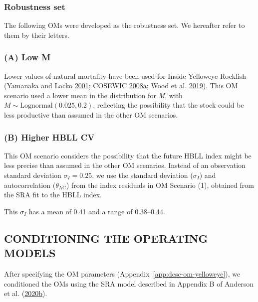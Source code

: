\documentclass[11pt]{book}
\begin{document}
\hypertarget{sec:approach3-robustness}{%
\subsubsection{Robustness set}\label{sec:approach3-robustness}}

The following OMs were developed as the robustness set. We hereafter refer to them by their letters.

\hypertarget{sec:approach3-referenceA}{%
\subsubsection{(A) Low M}\label{sec:approach3-referenceA}}

Lower values of natural mortality have been used for Inside Yelloweye Rockfish (Yamanaka and Lacko \protect\hyperlink{ref-yamanaka2001}{2001}; COSEWIC \protect\hyperlink{ref-cosewic2008}{2008}\protect\hyperlink{ref-cosewic2008}{a}; Wood et al. \protect\hyperlink{ref-wood2019}{2019}). This OM scenario used a lower mean in the distribution for \emph{M}, with \(M \sim \textrm{Lognormal}(0.025, 0.2)\), reflecting the possibility that the stock could be less productive than assumed in the other OM scenarios.

\hypertarget{sec:approach3-referenceB}{%
\subsubsection{(B) Higher HBLL CV}\label{sec:approach3-referenceB}}

This OM scenario considers the possibility that the future HBLL index might be less precise than assumed in the other OM scenarios. Instead of an observation standard deviation \(\sigma_I = 0.25\), we use the standard deviation (\(\sigma_I\)) and autocorrelation (\(\theta_\textrm{AC}\)) from the index residuals in OM Scenario (1), obtained from the SRA fit to the HBLL index.

This \(\sigma_I\) has a mean of 0.41 and a range of 0.38--0.44.

\hypertarget{sec:approach3-conditioning}{%
\subsection{CONDITIONING THE OPERATING MODELS}\label{sec:approach3-conditioning}}

After specifying the OM parameters (Appendix~\ref{app:desc-om-yelloweye}), we conditioned the OMs using the SRA model described in Appendix B of Anderson et al. (\protect\hyperlink{ref-anderson2020gfmp}{2020}\protect\hyperlink{ref-anderson2020gfmp}{b}).
\end{document}
